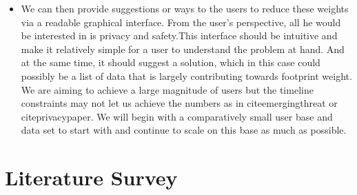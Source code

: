 \documentclass[11pt]{article}
\begin{document}
\begin{itemize}
   \item We can then provide suggestions or ways to the users to reduce these weights via a readable graphical interface. From the user’s perspective, all he would be interested in is privacy and safety.This interface should be intuitive and make it relatively simple for a user to understand the problem at hand. And at the same time, it should suggest a solution, which in this case could possibly be a list of data that is largely contributing towards footprint weight. We are aiming to achieve a large magnitude of users but the timeline constraints may not let us achieve the numbers as in cite{emergingthreat} or cite{privacypaper}. We will begin with a comparatively small user base and data set to start with and continue to scale on this base as much as possible.
   \end{itemize}

\section{Literature Survey}
\paragraph{}
\end{document}
